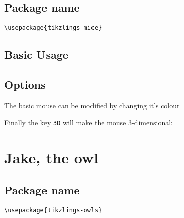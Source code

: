\documentclass[parskip=half]{scrartcl}
\begin{document}
\subsection{Package name}

\begin{tcolorbox}[lower separated=false, lefthand width=.8\linewidth]
\vspace*{0.5cm}
\lstinline|\usepackage{tikzlings-mice}|
\vspace*{0.5cm}
\end{tcolorbox}

\subsection{Basic Usage}

\begin{tcblisting}{}
\mouse
\end{tcblisting}

\subsection{Options}

The basic mouse can be modified by changing it's colour

\begin{tcblisting}{}
\mouse[body=SteelBlue]
\end{tcblisting}

Finally the key \lstinline|3D| will make the mouse 3-dimensional:

\begin{tcblisting}{}
\mouse[3D]
\end{tcblisting}


\clearpage
\section[Owl]{Jake, the owl}

\subsection{Package name}

\begin{tcolorbox}[lower separated=false, lefthand width=.8\linewidth]
\vspace*{0.5cm}
\lstinline|\usepackage{tikzlings-owls}|
\vspace*{0.5cm}
\end{tcolorbox}
\end{document}
